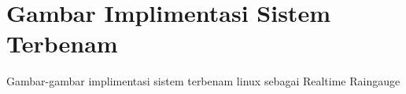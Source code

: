\chapter{Gambar Implimentasi Sistem Terbenam}

Gambar-gambar implimentasi sistem terbenam linux sebagai Realtime Raingauge
